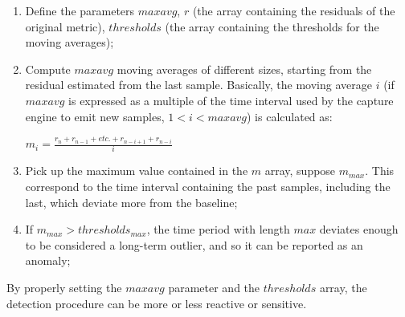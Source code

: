 \documentclass[12pt,a4paper,cucitura]{toptesi}
\begin{document}
\begin{enumerate}
\item Define the parameters $maxavg$, $r$ (the array containing the residuals of the original metric), $thresholds$ (the array containing the thresholds for the moving averages);
\item Compute $maxavg$ moving averages of different sizes, starting from the residual estimated from the last sample. Basically, the moving average $i$ (if $maxavg$ is expressed as a multiple of the time interval used by the capture engine to emit new samples, $1 < i < maxavg$) is calculated as:

\begin{center}
\Large
$m_i = \frac{r_n + r_{n-1} + etc. + r_{n-i+1} + r_{n-i}}{i}$
\end{center}

\item Pick up the maximum value contained in the $m$ array, suppose $m_{max}$. This correspond to the time interval containing the past samples, including the last, which deviate more from the baseline;

\item If $m_{max} > thresholds_{max}$, the time period with length $max$ deviates enough to be considered a long-term outlier, and so it can be reported as an anomaly;
\end{enumerate}

By properly setting the $maxavg$ parameter and the $thresholds$ array, the detection procedure can be more or less reactive or sensitive.
\end{document}
